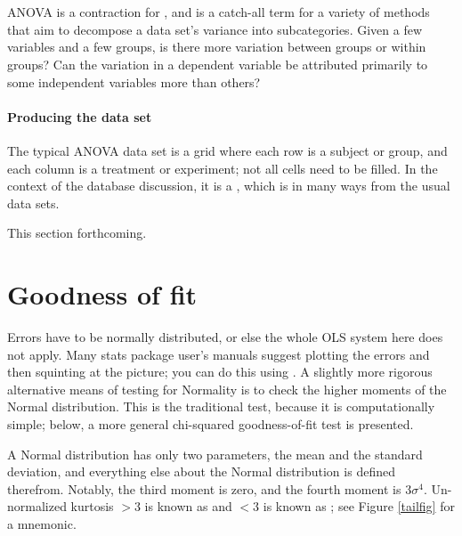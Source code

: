 \section{} ANOVA is a contraction for , and is a catch-all term for a variety of methods that
aim to decompose a data set's variance into subcategories. Given a few
variables and a few groups, is there more variation between groups or
within groups? Can the variation in a dependent variable be attributed
primarily to some independent variables more than others?

\paragraph{Producing the data set} The typical ANOVA data set is a grid
where each row is a subject or group, and each column is a treatment or
experiment; not all cells need to be filled. In the context of the
database discussion, it is a , which is in many ways
from the usual data sets.

This section forthcoming.

\section{Goodness of fit}

Errors have to be normally distributed, or else
the whole OLS system here does not apply. Many stats package user's manuals
suggest plotting the errors and then squinting at the picture; you can
do this using . 
A slightly more rigorous alternative means of testing for Normality
is to check the higher moments of the Normal distribution.  This is the
traditional test, because it is computationally simple; below, a more
general chi-squared goodness-of-fit test is presented.

A Normal distribution has only two parameters, the mean and the
standard deviation, and everything else about the Normal distribution is
defined therefrom. Notably, the third moment is zero, and the fourth
moment is $3 \sigma^4$. 
Un-normalized kurtosis $>3$ is known as  and $<3$ is
known as ; see Figure \ref{tailfig} for a mnemonic.

